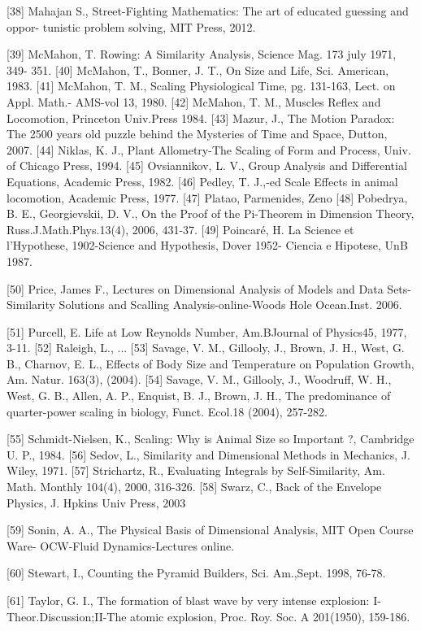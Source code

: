 [38] Mahajan S., Street-Fighting Mathematics: The art of educated guessing and oppor-
tunistic problem solving, MIT Press, 2012.

[39] McMahon, T. Rowing: A Similarity Analysis, Science Mag. 173 july 1971, 349-
351.
[40] McMahon, T., Bonner, J. T., On Size and Life, Sci. American, 1983.
[41] McMahon, T. M., Scaling Physiological Time, pg. 131-163, Lect. on Appl. Math.-
AMS-vol 13, 1980.
[42] McMahon, T. M., Muscles Reflex and Locomotion, Princeton Univ.Press 1984.
[43] Mazur, J., The Motion Paradox: The 2500 years old puzzle behind the Mysteries of
Time and Space, Dutton, 2007.
[44] Niklas, K. J., Plant Allometry-The Scaling of Form and Process, Univ. of Chicago
Press, 1994.
[45] Ovsiannikov, L. V., Group Analysis and Differential Equations, Academic Press,
1982.
[46] Pedley, T. J.,-ed Scale Effects in animal locomotion, Academic Press, 1977.
[47] Platao, Parmenides, Zeno
[48] Pobedrya, B. E., Georgievskii, D. V., On the Proof of the Pi-Theorem in Dimension
Theory, Russ.J.Math.Phys.13(4), 2006, 431-37.
[49] Poincaré, H. La Science et l’Hypothese, 1902-Science and Hypothesis, Dover 1952-
Ciencia e Hipotese, UnB 1987.

[50] Price, James F., Lectures on Dimensional Analysis of Models and Data Sets-
Similarity Solutions and Scalling Analysis-online-Woods Hole Ocean.Inst. 2006.

[51] Purcell, E. Life at Low Reynolds Number, Am.BJournal of Physics45, 1977,
3-11.
[52] Raleigh, L., ...
[53] Savage, V. M., Gillooly, J., Brown, J. H., West, G. B., Charnov, E. L., Effects of
Body Size and Temperature on Population Growth, Am. Natur. 163(3), (2004).
[54] Savage, V. M., Gillooly, J., Woodruff, W. H., West, G. B., Allen, A. P., Enquist,
B. J., Brown, J. H., The predominance of quarter-power scaling in biology, Funct.
Ecol.18 (2004), 257-282.

[55] Schmidt-Nielsen, K., Scaling: Why is Animal Size so Important ?, Cambridge U.
P., 1984.
[56] Sedov, L., Similarity and Dimensional Methods in Mechanics, J. Wiley, 1971.
[57] Strichartz, R., Evaluating Integrals by Self-Similarity, Am. Math. Monthly
104(4), 2000, 316-326.
[58] Swarz, C., Back of the Envelope Physics, J. Hpkins Univ Press, 2003

[59] Sonin, A. A., The Physical Basis of Dimensional Analysis, MIT Open Course Ware-
OCW-Fluid Dynamics-Lectures online.

[60] Stewart, I., Counting the Pyramid Builders, Sci. Am.,Sept. 1998, 76-78.

[61] Taylor, G. I., The formation of blast wave by very intense explosion: I-
Theor.Discussion;II-The atomic explosion, Proc. Roy. Soc. A 201(1950), 159-186.

